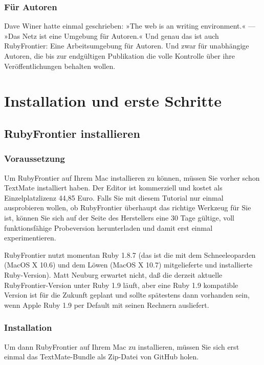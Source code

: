 \documentclass[11pt]{report}
\begin{document}
\subsection{Für Autoren}
\label{sec-1-1-2-6}


Dave Winer hatte einmal geschrieben: »The web is an writing
environment.« — »Das Netz ist eine Umgebung für Autoren.« Und genau
das ist auch RubyFrontier: Eine Arbeitsumgebung für Autoren. Und zwar
für unabhängige Autoren, die bis zur endgültigen Publikation die volle
Kontrolle über ihre Veröffentlichungen behalten wollen.
\chapter{Installation und erste Schritte}
\label{sec-1-2}
\section{RubyFrontier installieren}
\label{sec-1-2-1}
\subsection{Voraussetzung}
\label{sec-1-2-1-1}


Um RubyFrontier auf Ihrem Mac installieren zu können, müssen Sie vorher schon TextMate installiert haben. Der Editor ist kommerziell und kostet als Einzelplatzlizenz 44,85 Euro. Falls Sie mit diesem Tutorial nur einmal ausprobieren wollen, ob RubyFrontier überhaupt das richtige Werkzeug für Sie ist, können Sie sich auf der Seite des Herstellers eine 30 Tage gültige, voll funktionsfähige Probeversion herunterladen und damit erst einmal experimentieren.

RubyFrontier nutzt momentan Ruby 1.8.7 (das ist die mit dem Schneeleoparden (MacOS X 10.6) und dem Löwen (MacOS X 10.7) mitgelieferte und installierte Ruby-Version). Matt Neuburg erwartet nicht, daß die derzeit aktuelle RubyFrontier-Version unter Ruby 1.9 läuft, aber eine Ruby 1.9 kompatible Version ist für die Zukunft geplant und sollte spätestens dann vorhanden sein, wenn Apple Ruby 1.9 per Default mit seinen Rechnern ausliefert.
\subsection{Installation}
\label{sec-1-2-1-2}


Um dann RubyFrontier auf Ihrem Mac zu installieren, müssen Sie sich erst einmal das TextMate-Bundle als Zip-Datei von GitHub holen.
\end{document}
